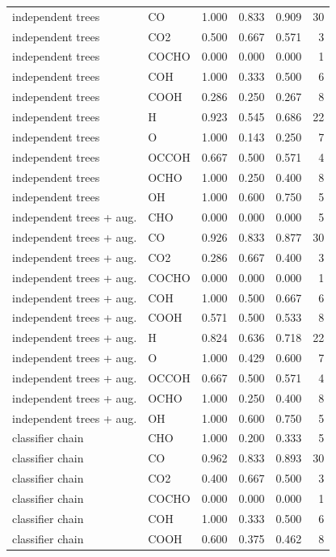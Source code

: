 \begin{longtable}{llrrrr}
independent trees & CO & 1.000 & 0.833 & 0.909 & 30\\
independent trees & CO2 & 0.500 & 0.667 & 0.571 & 3\\
independent trees & COCHO & 0.000 & 0.000 & 0.000 & 1\\
independent trees & COH & 1.000 & 0.333 & 0.500 & 6\\
independent trees & COOH & 0.286 & 0.250 & 0.267 & 8\\
independent trees & H & 0.923 & 0.545 & 0.686 & 22\\
independent trees & O & 1.000 & 0.143 & 0.250 & 7\\
independent trees & OCCOH & 0.667 & 0.500 & 0.571 & 4\\
independent trees & OCHO & 1.000 & 0.250 & 0.400 & 8\\
independent trees & OH & 1.000 & 0.600 & 0.750 & 5\\
independent trees + aug. & CHO & 0.000 & 0.000 & 0.000 & 5\\
independent trees + aug. & CO & 0.926 & 0.833 & 0.877 & 30\\
independent trees + aug. & CO2 & 0.286 & 0.667 & 0.400 & 3\\
independent trees + aug. & COCHO & 0.000 & 0.000 & 0.000 & 1\\
independent trees + aug. & COH & 1.000 & 0.500 & 0.667 & 6\\
independent trees + aug. & COOH & 0.571 & 0.500 & 0.533 & 8\\
independent trees + aug. & H & 0.824 & 0.636 & 0.718 & 22\\
independent trees + aug. & O & 1.000 & 0.429 & 0.600 & 7\\
independent trees + aug. & OCCOH & 0.667 & 0.500 & 0.571 & 4\\
independent trees + aug. & OCHO & 1.000 & 0.250 & 0.400 & 8\\
independent trees + aug. & OH & 1.000 & 0.600 & 0.750 & 5\\
classifier chain & CHO & 1.000 & 0.200 & 0.333 & 5\\
classifier chain & CO & 0.962 & 0.833 & 0.893 & 30\\
classifier chain & CO2 & 0.400 & 0.667 & 0.500 & 3\\
classifier chain & COCHO & 0.000 & 0.000 & 0.000 & 1\\
classifier chain & COH & 1.000 & 0.333 & 0.500 & 6\\
classifier chain & COOH & 0.600 & 0.375 & 0.462 & 8\\

\end{longtable}
